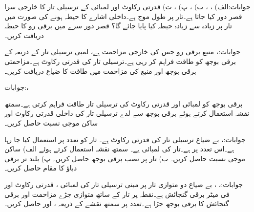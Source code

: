 جوابات:الف) ، ،  ب) ،  پ) ،  ت) 
قدرتی رکاوٹ  اور لمبائی  کے ترسیلی تار کا خارجی سرا قصر دور کیا جاتا ہے۔تار پر طول موج  ہے۔داخلی اشارے کا حیطہ  ہونے کی صورت میں تار پر زیادہ سے زیادہ حیطہ کیا پایا جائے گا؟ قصر دور سرے میں برقی رو کا حیطہ دریافت کریں۔

جوابات:، 
منبع برقی رو  جس کی خارجی مزاحمت  ہے،  لمبی ترسیلی تار کے ذریعہ  کے برقی بوجھ کو طاقت فراہم کر رہی ہے۔ترسیلی تار کی قدرتی رکاوٹ  ہے۔مزاحمتی برقی بوجھ اور منبع کی مزاحمت میں طاقت کا ضیاع دریافت کریں۔

جوابات:، 

برقی بوجھ  کو  لمبائی اور  قدرتی رکاوٹ کی ترسیلی تار طاقت فراہم کرتی ہے۔سمتھ نقشہ استعمال کرتے ہوئے برقی بوجھ سے لدے  ترسیلی تار کی داخلی قدرتی رکاوٹ  اور ساکن موجی نسبت  حاصل کریں۔

جوابات:، 
بے ضیاع ترسیلی تار کی قدرتی رکاوٹ   ہے۔ تار کو  تعدد پر استعمال کیا جا رہا ہے۔اس
 تعدد پر  ہے۔تار کی لمبائی  ہے۔ سمتھ نقشہ استعمال کرتے ہوئے  الف) ساکن موجی نسبت حاصل کریں۔ ب) تار پر نصب برقی بوجھ  حاصل کریں۔ پ) بلند تر برقی دباؤ کا مقام حاصل کریں۔

جوابات:، ، 
بے ضیاع دو متوازی تار پر مبنی ترسیلی تار کی لمبائی ، قدرتی رکاوٹ  اور فی میٹر برقی گنجائش  ہے۔نقطہ  پر تار کے ساتھ متوازی جڑے مزاحمت  اور برقی گنجائش  کا برقی بوجھ جڑا ہے۔تعدد  پر سمتھ نقشے کے ذریعہ ،  اور  حاصل کریں۔

